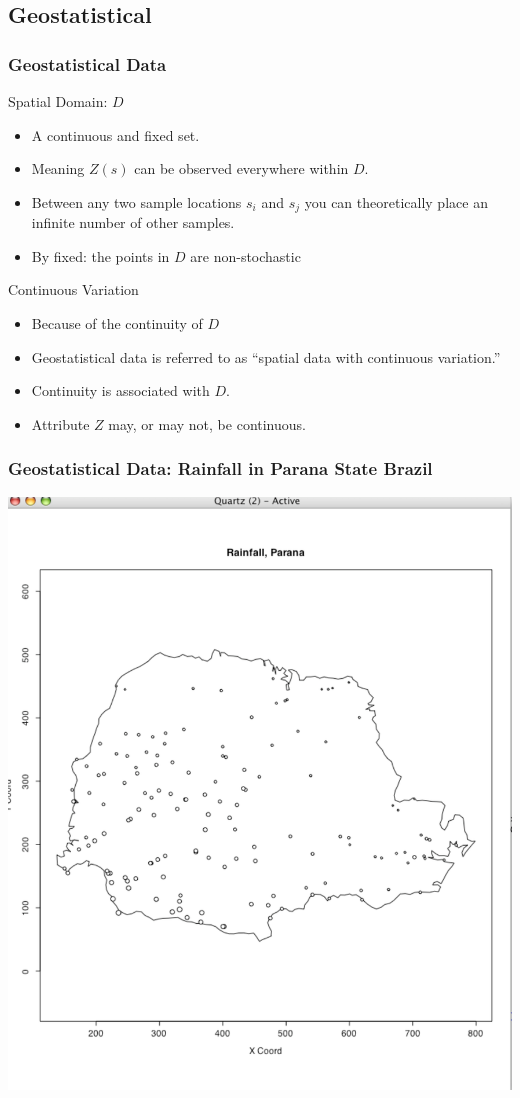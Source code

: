 \documentclass[nototal,handout]{beamer}
\begin{document}
\subsection{Geostatistical}
\begin{frame}[<+->]
  \frametitle{Geostatistical Data}
  \begin{block}{Spatial Domain: $D$ }
    \begin{itemize}
      \item A continuous and fixed set.
      \item Meaning $Z(s)$ can be observed everywhere within $D$.
      \item Between any two sample locations $s_i$ and $s_j$ you can
	theoretically place an infinite number of other samples.
      \item By fixed: the points in $D$ are non-stochastic
    \end{itemize}
   \end{block}
\begin{block}{Continuous Variation}
    \begin{itemize}
      \item Because of the continuity of $D$
      \item Geostatistical data is referred to as ``spatial data with
	continuous variation.''
      \item Continuity is associated with $D$.
      \item Attribute $Z$ may, or may not, be continuous.
    \end{itemize}
   \end{block}
 \end{frame}
 \begin{frame}
   \frametitle{Geostatistical Data: Rainfall in Parana State Brazil}
   \begin{center}
     \includegraphics[width=.65\linewidth]{rainfall.pdf}
   \end{center}
 \end{frame}
\end{document}
